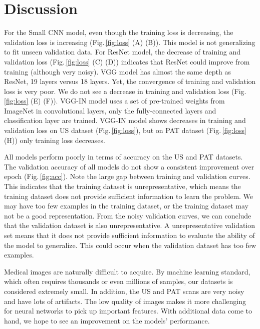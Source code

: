 \section{Discussion}
\label{result_discussion}

For the Small CNN model, even though the training loss is decreasing, the validation loss is increasing (Fig.\,\ref{fig:loss} (A) (B)). This model is not generalizing to fit unseen validation data. For ResNet model, the decrease of training and validation loss (Fig.\,\ref{fig:loss} (C) (D)) indicates that ResNet could improve from training (although very noisy). VGG model has almost the same depth as ResNet, 19 layers versus 18 layers. Yet, the convergence of training and validation loss is very poor. We do not see a decrease in training and validation loss (Fig.\,\ref{fig:loss} (E) (F)). VGG-IN model uses a set of pre-trained weights from ImageNet \citep{imagenet_cvpr09} in convolutional layers, only the fully-connected layers and classification layer are trained. VGG-IN model shows decreases in training and validation loss on US dataset (Fig.\,\ref{fig:loss}), but on PAT dataset (Fig.\,\ref{fig:loss} (H)) only training loss decreases.

All models perform poorly in terms of accuracy on the US and PAT datasets. The validation accuracy of all models do not show a consistent improvement over epoch (Fig.\,\ref{fig:acc}). Note the large gap between training and validation curves. This indicates that the training dataset is unrepresentative, which means the training dataset does not provide sufficient information to learn the problem. We may have too few examples in the training dataset, or the training dataset may not be a good representation. From the noisy validation curves, we can conclude that the validation dataset is also unrepresentative. A unrepresentative validation set means that it does not provide sufficient information to evaluate the ability of the model to generalize. This could occur when the validation dataset has too few examples.

Medical images are naturally difficult to acquire. By machine learning standard, which often requires thousands or even millions of samples, our datasets is considered extremely small. In addition, the US and PAT scans are very noisy and have lots of artifacts. The low quality of images makes it more challenging for neural networks to pick up important features. With additional data come to hand, we hope to see an improvement on the models' performance.

